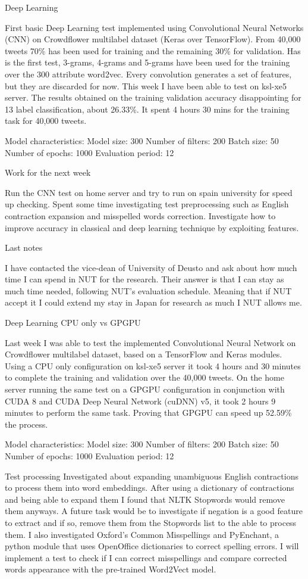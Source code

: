 Deep Learning

First basic Deep Learning test implemented using Convolutional Neural Networks (CNN) on Crowdflower multilabel dataset (Keras over TensorFlow). From 40,000 tweets 70\% has been used for training and the remaining 30\% for validation. Has is the first test, 3-grams, 4-grams and 5-grams have been used for the training over the 300 attribute word2vec. Every convolution generates a set of features, but they are discarded for now.
This week I have been able to test on ksl-xe5 server. The results obtained on the training validation accuracy disappointing for 13 label classification, about 26.33\%. It spent 4 hours 30 mins for the training task for 40,000 tweets.

Model characteristics:
Model size: 300
Number of filters: 200
Batch size: 50
Number of epochs: 1000
Evaluation period: 12

Work for the next week

Run the CNN test on home server and try to run on spain university for speed up checking.
Spent some time investigating test preprocessing such as English contraction expansion and misspelled words correction.
Investigate how to improve accuracy in classical and deep learning technique by exploiting features.

Last notes

I have contacted the vice-dean of University of Deusto and ask about how much time I can spend in NUT for the research. Their answer is that I can stay as much time needed, following NUT’s evaluation schedule. 
Meaning that if NUT accept it I could extend my stay in Japan for research as much I NUT allows me.

Deep Learning CPU only vs GPGPU

Last week I was able to test the implemented Convolutional Neural Network on Crowdflower multilabel dataset, based on a TensorFlow and Keras modules.
Using a CPU only configuration on ksl-xe5 server it took 4 hours and 30 minutes to complete the training and validation over the 40,000 tweets.
On the home server running the same test on a GPGPU configuration in conjunction with CUDA 8 and CUDA Deep Neural Network (cuDNN) v5\cite{chetlur2014cudnn}, it took 2 hours 9 minutes to perform the same task. Proving that GPGPU can speed up 52.59\% the process.

Model characteristics:
Model size: 300
Number of filters: 200
Batch size: 50
Number of epochs: 1000
Evaluation period: 12

Test processing
Investigated about expanding unambiguous English contractions to process them into word embeddings. After using a dictionary of contractions and being able to expand them I found that NLTK Stopwords would remove them anyways. A future task would be to investigate if negation is a good feature to extract and if so, remove them from the Stopwords list to the able to process them.
I also investigated Oxford’s Common Misspellings and PyEnchant, a python module that uses OpenOffice dictionaries to correct spelling errors. I will implement a test to check if I can correct misspellings and compare corrected words appearance with the pre-trained Word2Vect model.

